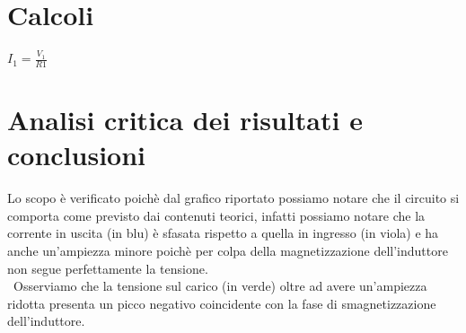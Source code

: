 \documentclass[12pt]{article}
\begin{document}
\section{Calcoli}
$I_{1}=\frac{V_{1}}{R1}$
\section{Analisi critica dei risultati e conclusioni}
Lo scopo è verificato poichè dal grafico riportato possiamo notare che il circuito si comporta come previsto dai
contenuti teorici, infatti possiamo notare che la corrente in uscita (in blu) è sfasata rispetto a quella in ingresso
(in viola) e ha anche un'ampiezza minore poichè per colpa della magnetizzazione dell'induttore non segue perfettamente
la tensione.\\\
Osserviamo che la tensione sul carico (in verde)  oltre ad avere un'ampiezza ridotta presenta un picco negativo coincidente
con la fase di smagnetizzazione dell'induttore.\\
\end{document}
